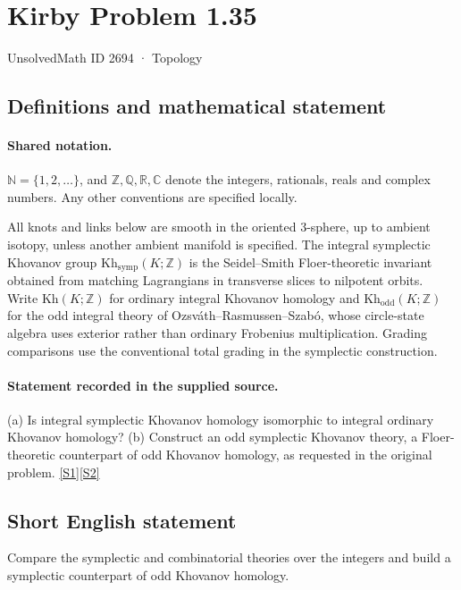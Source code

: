 \documentclass[11pt]{article}
\newcommand{\sref}[2]{\hyperlink{source:#1:#2}{[S#2]}}
\begin{document}
\setcounter{section}{2693}
\section{Kirby Problem 1.35}\label{2694}
{\small\sffamily UnsolvedMath ID 2694 · Topology}
\subsection{Definitions and mathematical statement}

\paragraph{Shared notation.}$\mathbb N=\{1,2,\ldots\}$, and $\mathbb Z,\mathbb Q,\mathbb R,\mathbb C$ denote the integers, rationals, reals and complex numbers. Any other conventions are specified locally.


All knots and links below are smooth in the oriented $3$-sphere, up to ambient isotopy, unless another ambient manifold is specified. The integral symplectic Khovanov group $\mathrm{Kh}_{\mathrm{symp}}(K;\mathbb Z)$ is the Seidel--Smith Floer-theoretic invariant obtained from matching Lagrangians in transverse slices to nilpotent orbits. Write $\mathrm{Kh}(K;\mathbb Z)$ for ordinary integral Khovanov homology and $\mathrm{Kh}_{\mathrm{odd}}(K;\mathbb Z)$ for the odd integral theory of Ozsv\'ath--Rasmussen--Szab\'o, whose circle-state algebra uses exterior rather than ordinary Frobenius multiplication. Grading comparisons use the conventional total grading in the symplectic construction.
\paragraph{Statement recorded in the supplied source.}
(a) Is integral symplectic Khovanov homology isomorphic to integral ordinary Khovanov homology? (b) Construct an odd symplectic Khovanov theory, a Floer-theoretic counterpart of odd Khovanov homology, as requested in the original problem. \sref{2694}{1}\sref{2694}{2}
\subsection{Short English statement}
Compare the symplectic and combinatorial theories over the integers and build a symplectic counterpart of odd Khovanov homology.
\end{document}
